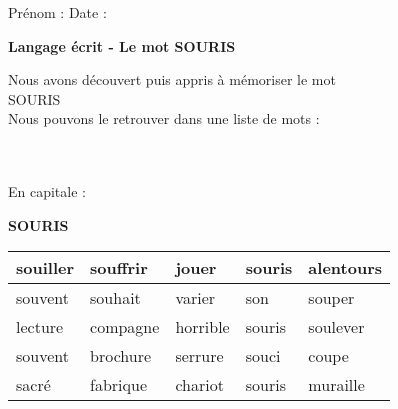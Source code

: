 \documentclass[a4paper, 11pt,oneside, fleqn]{article}
\begin{document}
\newcommand{\x}{\times}
\renewcommand{\arraystretch}{1.5}

\sloppy
\pagestyle{empty}
\begin{onehalfspace}


\sffamily \noindent \Large Pr\'enom : \fbox{\begin{minipage}{9cm} \vspace{1.2cm}\hspace{9cm} \end{minipage}} \hspace{1.5cm}\Large Date :\vspace{2mm}\\
\begin{minipage}{12cm}
\begin{center}
\Large\textbf{Langage \'ecrit - Le mot \MakeUppercase{souris}}
\end{center}
\normalsize Nous avons d\'ecouvert puis appris \`a m\'emoriser le mot\\
\MakeUppercase{souris}\\
Nous pouvons le retrouver dans une liste de mots : \end{minipage}\\
\vspace{0.25cm}\\
 
\large\noindent En capitale :
\begin{center}
{\huge \textbf{\MakeUppercase{souris}}}
\vspace{0.25cm}\\
\begin{tabulary}{17cm}{|g|g|g|g|g|}
\hline
souiller & souffrir & jouer & souris & alentours \\
\hline
souvent & souhait & varier & son & souper \\
\hline
lecture & compagne & horrible & souris & soulever \\
\hline
souvent & brochure & serrure & souci & coupe \\
\hline
sacré & fabrique & chariot & souris & muraille \\
\hline
\end{tabulary}
\end{center}
\vspace{0.5cm}


\end{onehalfspace}
\end{document}
